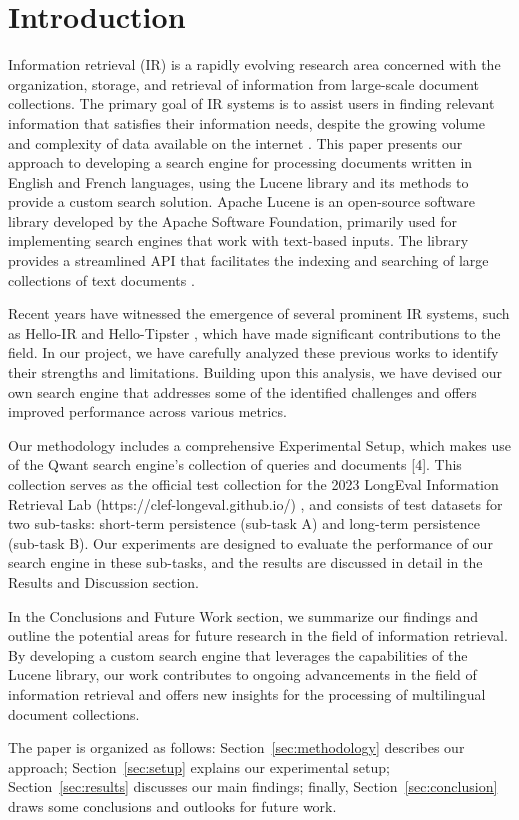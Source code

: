 \section{Introduction}
\label{sec:introduction}

Information retrieval (IR) is a rapidly evolving research area concerned with the organization, storage, and retrieval of information from large-scale document collections. The primary goal of IR systems is to assist users in finding relevant information that satisfies their information needs, despite the growing volume and complexity of data available on the internet \cite{ZhangSanner2021}. This paper presents our approach to developing a search engine for processing documents written in English and French languages, using the Lucene library \cite{lucene3.5.0} and its methods to provide a custom search solution. Apache Lucene is an open-source software library developed by the Apache Software Foundation, primarily used for implementing search engines that work with text-based inputs. The library provides a streamlined API that facilitates the indexing and searching of large collections of text documents \cite{lucene2010apache}.

Recent years have witnessed the emergence of several prominent IR systems, such as Hello-IR \cite{chimetto2022seupd} and Hello-Tipster \cite{BaruscoEtAl2022}, which have made significant contributions to the field. In our project, we have carefully analyzed these previous works to identify their strengths and limitations. Building upon this analysis, we have devised our own search engine that addresses some of the identified challenges and offers improved performance across various metrics.

Our methodology includes a comprehensive Experimental Setup, which makes use of the Qwant search engine's collection of queries and documents [4]. This collection serves as the official test collection for the 2023 LongEval Information Retrieval Lab (https://clef-longeval.github.io/) \cite{CLEFLongEval}, and consists of test datasets for two sub-tasks: short-term persistence (sub-task A) and long-term persistence (sub-task B). Our experiments are designed to evaluate the performance of our search engine in these sub-tasks, and the results are discussed in detail in the Results and Discussion section.

In the Conclusions and Future Work section, we summarize our findings and outline the potential areas for future research in the field of information retrieval. By developing a custom search engine that leverages the capabilities of the Lucene library, our work contributes to ongoing advancements in the field of information retrieval and offers new insights for the processing of multilingual document collections.


The paper is organized as follows: Section~\ref{sec:methodology} describes our approach; Section~\ref{sec:setup} explains our experimental setup; Section~\ref{sec:results} discusses our main findings; finally, Section~\ref{sec:conclusion} draws some conclusions and outlooks for future work.